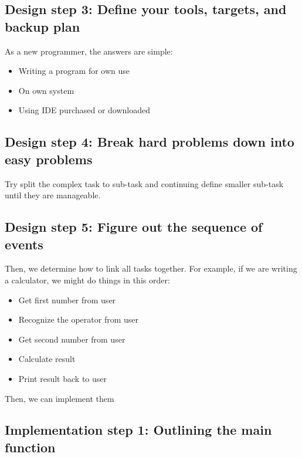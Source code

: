 \documentclass[
  letterpaper,
  DIV=11,
  numbers=noendperiod]{scrreprt}
\providecommand{\tightlist}{%
  \setlength{\itemsep}{0pt}\setlength{\parskip}{0pt}}\usepackage{longtable,booktabs,array}
\begin{document}
\hypertarget{design-step-3-define-your-tools-targets-and-backup-plan}{%
\subsection{Design step 3: Define your tools, targets, and backup
plan}\label{design-step-3-define-your-tools-targets-and-backup-plan}}

As a new programmer, the answers are simple:

\begin{itemize}
\tightlist
\item
  Writing a program for own use
\item
  On own system
\item
  Using IDE purchased or downloaded
\end{itemize}

\hypertarget{design-step-4-break-hard-problems-down-into-easy-problems}{%
\subsection{Design step 4: Break hard problems down into easy
problems}\label{design-step-4-break-hard-problems-down-into-easy-problems}}

Try split the complex task to sub-task and continuing define smaller
sub-task until they are manageable.

\hypertarget{design-step-5-figure-out-the-sequence-of-events}{%
\subsection{Design step 5: Figure out the sequence of
events}\label{design-step-5-figure-out-the-sequence-of-events}}

Then, we determine how to link all tasks together. For example, if we
are writing a calculator, we might do things in this order:

\begin{itemize}
\tightlist
\item
  Get first number from user
\item
  Recognize the operator from user
\item
  Get second number from user
\item
  Calculate result
\item
  Print result back to user
\end{itemize}

Then, we can implement them

\hypertarget{implementation-step-1-outlining-the-main-function}{%
\subsection{Implementation step 1: Outlining the main
function}\label{implementation-step-1-outlining-the-main-function}}
\end{document}
